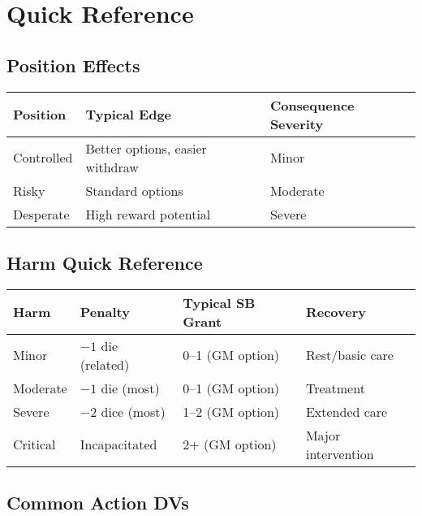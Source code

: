 \section{Quick Reference}
\label{sec:combat-quick-ref}

\subsection{Position Effects}
\label{subsec:position-quick-ref}

\begin{center}
\begin{tabular}{lll}
\toprule
\textbf{Position} & \textbf{Typical Edge} & \textbf{Consequence Severity} \\
\midrule
Controlled & Better options, easier withdraw & Minor \\
Risky      & Standard options               & Moderate \\
Desperate  & High reward potential           & Severe \\
\bottomrule
\end{tabular}
\end{center}

\subsection{Harm Quick Reference}
\label{subsec:harm-quick-ref}

\begin{center}
\begin{tabular}{llll}
\toprule
\textbf{Harm} & \textbf{Penalty} & \textbf{Typical SB Grant} & \textbf{Recovery} \\
\midrule
Minor   & $-1$ die (related) & 0--1 (GM option) & Rest/basic care \\
Moderate& $-1$ die (most)    & 0--1 (GM option) & Treatment \\
Severe  & $-2$ dice (most)   & 1--2 (GM option) & Extended care \\
Critical& Incapacitated      & 2+ (GM option)   & Major intervention \\
\bottomrule
\end{tabular}
\end{center}

\subsection{Common Action DVs}
\label{subsec:action-dvs}

